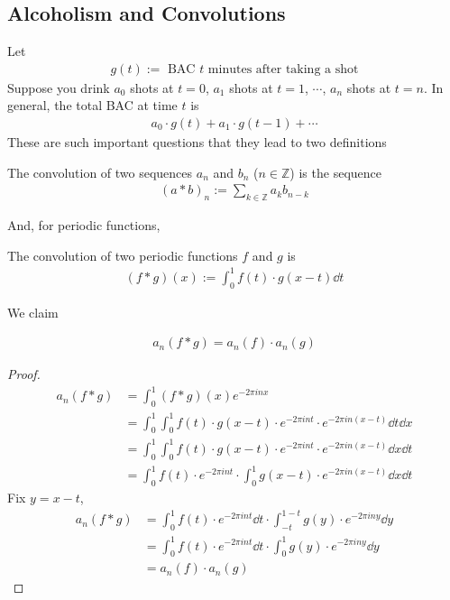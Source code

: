 \subsection{Alcoholism and Convolutions}
Let
\begin{align}
    g(t):= \text{ BAC $t$ minutes after taking a shot}
\end{align}
Suppose you drink $a_0$ shots at $t=0$, $a_1$ shots at $t=1$, $\cdots$, $a_n$ shots at $t=n$. In general, the total BAC at time $t$ is
\begin{align}
    a_0\cdot g(t) + a_1\cdot g(t-1) + \cdots
\end{align}
These are such important questions that they lead to two definitions
\begin{definition}
    The convolution of two sequences $a_n$ and $b_n$ ($n \in \mathbb{Z}$) is the sequence
    \begin{align}
        (a * b)_n := \sum_{k \in \mathbb{Z}} a_k b_{n-k}
    \end{align}
\end{definition}
\noindent And, for periodic functions,
\begin{definition}
    The convolution of two periodic functions $f$ and $g$ is
    \begin{align}
        (f * g)(x) := \int_0^1 f(t)\cdot g(x-t) \dd{t}
    \end{align}
\end{definition}
\noindent We claim
\begin{theorem}
    \begin{align}
        a_n(f * g) = a_n(f) \cdot a_n(g)
    \end{align}
\end{theorem}
\begin{proof}
    \begin{align}
        a_n(f * g) &= \int_0^1 (f*g)(x) e^{-2\pi in x}\\
        &= \int_0^1 \int_0^1 f(t) \cdot g(x-t) \cdot e^{-2\pi in t} \cdot e^{-2\pi in (x-t)} \dd{t} \dd{x}\\
        &= \int_0^1 \int_0^1 f(t) \cdot g(x-t) \cdot e^{-2\pi in t} \cdot e^{-2\pi in (x-t)} \dd{x} \dd{t}\\
        &= \int_0^1 f(t) \cdot e^{-2\pi in t} \cdot \int_0^1 g(x-t)  \cdot e^{-2\pi in (x-t)} \dd{x} \dd{t}
    \end{align}
    Fix $y = x-t$,
    \begin{align}
        a_n(f * g) &= \int_0^1 f(t) \cdot e^{-2\pi in t} \dd{t} \cdot \int_{-t}^{1-t} g(y)  \cdot e^{-2\pi in y} \dd{y} \\
        &= \int_0^1 f(t) \cdot e^{-2\pi in t} \dd{t} \cdot \int_{0}^{1} g(y) \cdot e^{-2\pi in y} \dd{y}\\
        &= a_n(f) \cdot a_n(g)
    \end{align}
\end{proof}
